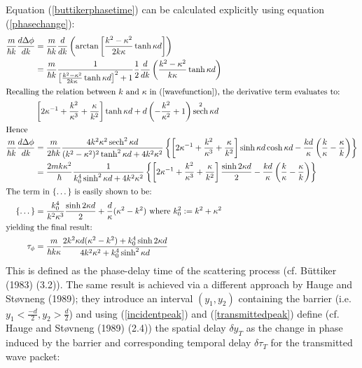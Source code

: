 \documentclass{article}
\DeclareMathOperator{\sech}{sech}
\begin{document}
\noindent Equation (\ref{buttikerphasetime}) can be calculated explicitly using equation (\ref{phasechange}):
\begin{subequations}
\begin{align}
	\frac{m}{\hbar k}\frac{d\Delta\phi}{dk}&=\frac{m}{\hbar k}\frac{d}{dk}\left(\arctan{\left[\frac{k^2-\kappa^2}{2k\kappa}\tanh{\kappa d}\right]}\right) \\
					       &=\frac{m}{\hbar k}\frac{1}{\left[\frac{k^2-\kappa^2}{2k\kappa}\tanh{\kappa d}\right]^2+1}\frac{1}{2}\frac{d}{dk}\left(\frac{k^2-\kappa^2}{k\kappa}\tanh{\kappa d}\right) \\ \intertext{Recalling the relation between $k$ and $\kappa$ in (\ref{wavefunction}), the derivative term evaluates to:}
					       &\left[2\kappa^{-1}+\frac{k^2}{\kappa^3}+\frac{\kappa}{k^2}\right]\tanh{\kappa d} + d\left(-\frac{k^2}{\kappa^2}+1\right)\sech^2{\kappa d}\\ \intertext{Hence}
	\frac{m}{\hbar k}\frac{d\Delta\phi}{dk}&=\frac{m}{2\hbar k}\frac{4k^2\kappa^2\sech^2{\kappa d}}{(k^2-\kappa^2)^2\tanh^2{\kappa d}+4k^2\kappa^2}\left\{\left[2\kappa^{-1}+\frac{k^2}{\kappa^3}+\frac{\kappa}{k^2}\right]\sinh{\kappa d}\cosh{\kappa d}-\frac{kd}{\kappa}\left(\frac{k}{\kappa}-\frac{\kappa}{k}\right)\right\}\\
					       &=\frac{2mk\kappa^2}{\hbar}\frac{1}{k_0^4\sinh^2{\kappa d}+4k^2\kappa^2}\left\{\left[2\kappa^{-1}+\frac{k^2}{\kappa^3}+\frac{\kappa}{k^2}\right]\frac{\sinh{2\kappa d}}{2}-\frac{kd}{\kappa}\left(\frac{k}{\kappa}-\frac{\kappa}{k}\right)\right\} \\ \intertext{The term in \{\dots\} is easily shown to be:}
	\{\dots\} &= \frac{k_0^4}{k^2\kappa^3}\frac{\sinh{2\kappa d}}{2}+\frac{d}{\kappa}(\kappa^2-k^2) \text{ where } k_0^2 := k^2+\kappa^2\\ \intertext{yielding the final result:}
	\tau_\phi &= \frac{m}{\hbar k \kappa}\frac{2k^2\kappa d(\kappa^2-k^2)+k_0^4\sinh{2\kappa d}}{4k^2\kappa^2+k_0^4\sinh^2{\kappa d}} \label{phasedelaytime}
\end{align}
\end{subequations}
\noindent This is defined as the phase-delay time of the scattering process (cf. B{\"u}ttiker (1983) (3.2)). The same result is achieved via a different approach by Hauge and St{\o}vneng (1989); they introduce an interval $(y_1, y_2)$ containing the barrier (i.e. $y_1<\frac{-d}{2},y_2>\frac{d}{2}$) and using (\ref{incidentpeak}) and (\ref{transmittedpeak}) define (cf. Hauge and St{\o}vneng (1989) (2.4)) the spatial delay $\delta y_T$ as the change in phase induced by the barrier and corresponding temporal delay $\delta\tau_T$ for the transmitted wave packet:
\end{document}
